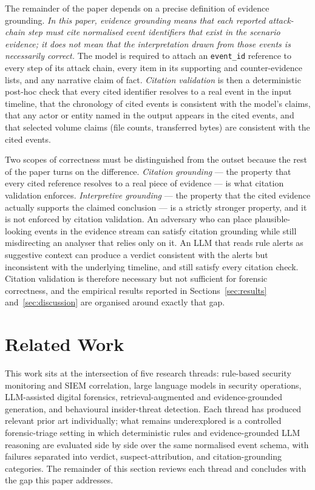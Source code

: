 \documentclass[conference]{IEEEtran}
\begin{document}
The remainder of the paper depends on a precise definition of evidence grounding. \emph{In this paper, evidence grounding means that each reported attack-chain step must cite normalised event identifiers that exist in the scenario evidence; it does not mean that the interpretation drawn from those events is necessarily correct.} The model is required to attach an \texttt{event\_id} reference to every step of its attack chain, every item in its supporting and counter-evidence lists, and any narrative claim of fact. \emph{Citation validation} is then a deterministic post-hoc check that every cited identifier resolves to a real event in the input timeline, that the chronology of cited events is consistent with the model's claims, that any actor or entity named in the output appears in the cited events, and that selected volume claims (file counts, transferred bytes) are consistent with the cited events.

Two scopes of correctness must be distinguished from the outset because the rest of the paper turns on the difference. \emph{Citation grounding} --- the property that every cited reference resolves to a real piece of evidence --- is what citation validation enforces. \emph{Interpretive grounding} --- the property that the cited evidence actually supports the claimed conclusion --- is a strictly stronger property, and it is not enforced by citation validation. An adversary who can place plausible-looking events in the evidence stream can satisfy citation grounding while still misdirecting an analyser that relies only on it. An LLM that reads rule alerts as suggestive context can produce a verdict consistent with the alerts but inconsistent with the underlying timeline, and still satisfy every citation check. Citation validation is therefore necessary but not sufficient for forensic correctness, and the empirical results reported in Sections~\ref{sec:results} and~\ref{sec:discussion} are organised around exactly that gap.

\section{Related Work}
\label{sec:related}

This work sits at the intersection of five research threads: rule-based security monitoring and SIEM correlation, large language models in security operations, LLM-assisted digital forensics, retrieval-augmented and evidence-grounded generation, and behavioural insider-threat detection. Each thread has produced relevant prior art individually; what remains underexplored is a controlled forensic-triage setting in which deterministic rules and evidence-grounded LLM reasoning are evaluated side by side over the same normalised event schema, with failures separated into verdict, suspect-attribution, and citation-grounding categories. The remainder of this section reviews each thread and concludes with the gap this paper addresses.
\end{document}
